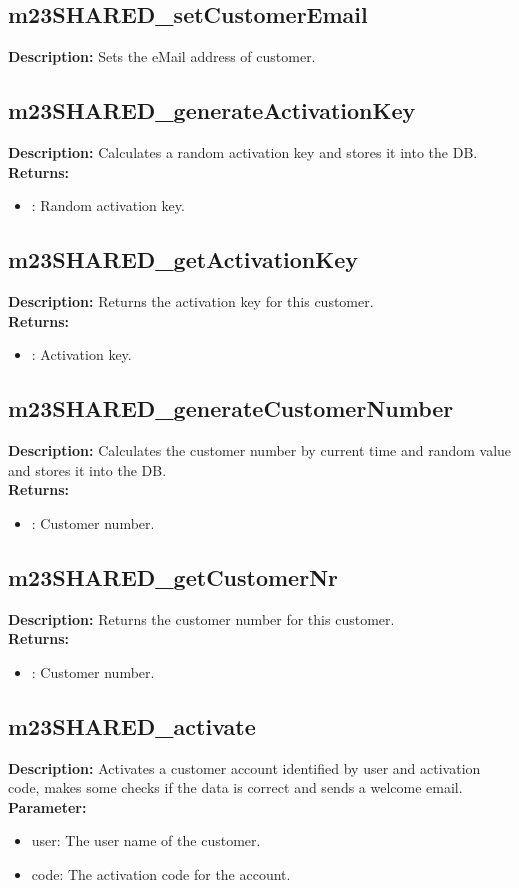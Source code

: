 \subsection{m23SHARED\_setCustomerEmail}
\textbf{Description:} Sets the eMail address of customer.\\

\subsection{m23SHARED\_generateActivationKey}
\textbf{Description:} Calculates a random activation key and stores it into the DB.\\
\textbf{Returns:}
\begin{itemize}
\item : Random activation key.
\end{itemize}

\subsection{m23SHARED\_getActivationKey}
\textbf{Description:} Returns the activation key for this customer.\\
\textbf{Returns:}
\begin{itemize}
\item : Activation key.
\end{itemize}

\subsection{m23SHARED\_generateCustomerNumber}
\textbf{Description:} Calculates the customer number by current time and random value and stores it into the DB.\\
\textbf{Returns:}
\begin{itemize}
\item : Customer number.
\end{itemize}

\subsection{m23SHARED\_getCustomerNr}
\textbf{Description:} Returns the customer number for this customer.\\
\textbf{Returns:}
\begin{itemize}
\item : Customer number.
\end{itemize}

\subsection{m23SHARED\_activate}
\textbf{Description:} Activates a customer account identified by user and activation code, makes some checks if the data is correct and sends a welcome email.\\
\textbf{Parameter:}
\begin{itemize}
\item user: The user name of the customer.
\item code: The activation code for the account.
\end{itemize}

